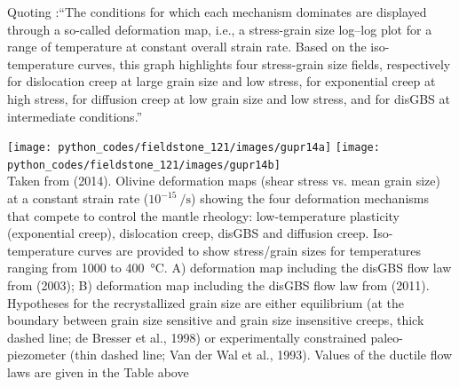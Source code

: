 

Quoting \cite{gupr14}:``The conditions for
which each mechanism dominates are displayed through a so-called deformation map, 
i.e., a stress-grain size log–log plot for a range of temperature at constant overall strain rate. 
Based on the iso-temperature
curves, this graph highlights four stress-grain size fields, respectively
for dislocation creep at large grain size and low stress, for exponential
creep at high stress, for diffusion creep at low grain size and low stress,
and for disGBS at intermediate conditions.''

\begin{center}
\texttt{[image: python\_codes/fieldstone\_121/images/gupr14a]}
\texttt{[image: python\_codes/fieldstone\_121/images/gupr14b]}\\
{\captionfont Taken from \textcite{gupr14} (2014). Olivine deformation maps 
(shear stress vs. mean grain size) at a constant strain rate ($10^{-15}~\si{\per\second}$) 
showing the four deformation mechanisms that compete to control the mantle rheology: 
low-temperature plasticity (exponential creep), dislocation creep, disGBS
and diffusion creep. Iso-temperature curves are provided to show stress/grain sizes for
temperatures ranging from 1000 to 400~\si{\celsius}. 
A) deformation map including the disGBS
flow law from \textcite{hiko03} (2003); 
B) deformation map including the disGBS flow law from \textcite{hazk11} (2011). 
Hypotheses for the recrystallized grain size are either
equilibrium (at the boundary between grain size sensitive and grain size insensitive
creeps, thick dashed line; de Bresser et al., 1998) or experimentally constrained paleo-
piezometer (thin dashed line; Van der Wal et al., 1993). Values of the ductile flow laws
are given in the Table above}
\end{center}


